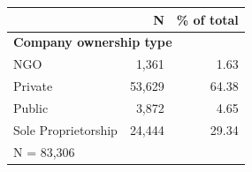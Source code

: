 \begin{tabular}{lrr}


\toprule


 & N & \% of total \\


\midrule


\multicolumn{3}{l}{\textbf{Company ownership type}}\\ 
\midrule
NGO                 &       1,361&        1.63\\
Private             &      53,629&       64.38\\
Public              &       3,872&        4.65\\
Sole Proprietorship &      24,444&       29.34\\
\midrule


\multicolumn{3}{l}{\footnotesize N =       83,306}\\


\bottomrule


\end{tabular}


